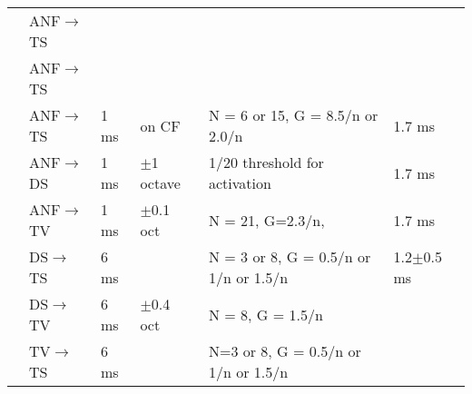 \begin{longtable}{cXXXXXX}
            \citealp*{WangSachs:1995}             &  ANF\ensuremath{\rightarrow}TS  &               &                                                                           & 
                                                  & \\
         \citealp*{LaiWinslowEtAl:1994}           &  ANF\ensuremath{\rightarrow}TS  &               &                                                                           & 
                                                  & \\ \midrule
         \citealp*{ErikssonRobert:1999}           &  ANF\ensuremath{\rightarrow}TS  &     1 ms      &                                   on CF                                   & N = 6 or 15,        G =  8.5/n  or 2.0/n                    
                                                  & 1.7 ms \\
                                                  & {ANF\ensuremath{\rightarrow}DS} &    {1 ms }    &                               $\pm$1 octave                               & {1/20 threshold for activation }      
                                                  & 1.7 ms \\
                                                  &  ANF\ensuremath{\rightarrow}TV  &     1 ms      &                               $\pm$0.1 oct                                & N = 21,   G=2.3/n,        
                                                  & 1.7 ms\\ 
                                                  &  DS\ensuremath{\rightarrow}TS   &     6 ms      &                                                                           & N = 3 or 8, G = 0.5/n or 1/n or 1.5/n                         
                                                  & 1.2$\pm$0.5 ms \\ 
                                                  &  DS\ensuremath{\rightarrow}TV   &     6 ms      &                               $\pm$0.4 oct                                & N = 8,     G = 1.5/n        
                                                  & \\ 
                                                  &  TV\ensuremath{\rightarrow}TS   &     6 ms      &                                                                           & N=3 or 8, G = 0.5/n or 1/n or 1.5/n  

\end{longtable}
